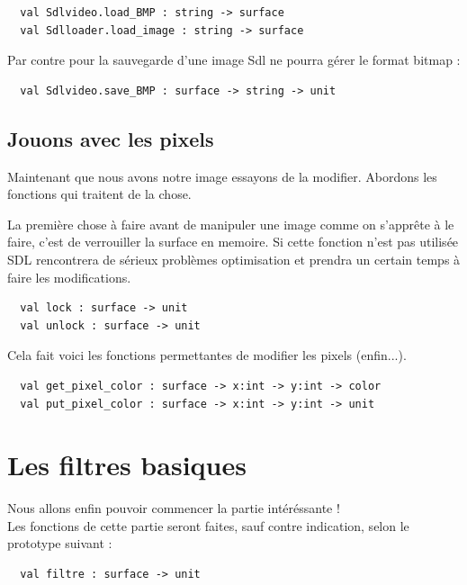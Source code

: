 \documentclass[a4paper]{article}
\begin{document}
\begin{verbatim}
  val Sdlvideo.load_BMP : string -> surface
  val Sdlloader.load_image : string -> surface
\end{verbatim}

\noindent
Par contre pour la sauvegarde d'une image Sdl ne pourra gérer le format bitmap :

\begin{verbatim}
  val Sdlvideo.save_BMP : surface -> string -> unit
\end{verbatim}


\subsection{Jouons avec les pixels}

Maintenant que nous avons notre image essayons de la modifier. Abordons les fonctions qui traitent de la chose.\par\bigskip

La première chose à faire avant de manipuler une image comme on s'apprête à le faire, c'est de verrouiller la surface en memoire. Si cette fonction n'est pas utilisée SDL rencontrera de sérieux problèmes optimisation et prendra un certain temps à faire les modifications.

\begin{verbatim}
  val lock : surface -> unit
  val unlock : surface -> unit
\end{verbatim}

\noindent
Cela fait voici les fonctions permettantes de modifier les pixels (enfin...).

\begin{verbatim}
  val get_pixel_color : surface -> x:int -> y:int -> color
  val put_pixel_color : surface -> x:int -> y:int -> unit
\end{verbatim}

\section{Les filtres basiques}

Nous allons enfin pouvoir commencer la partie intéréssante !\\
Les fonctions de cette partie seront faites, sauf contre indication, selon le prototype suivant :

\begin{verbatim}
  val filtre : surface -> unit
\end{verbatim}
\end{document}
